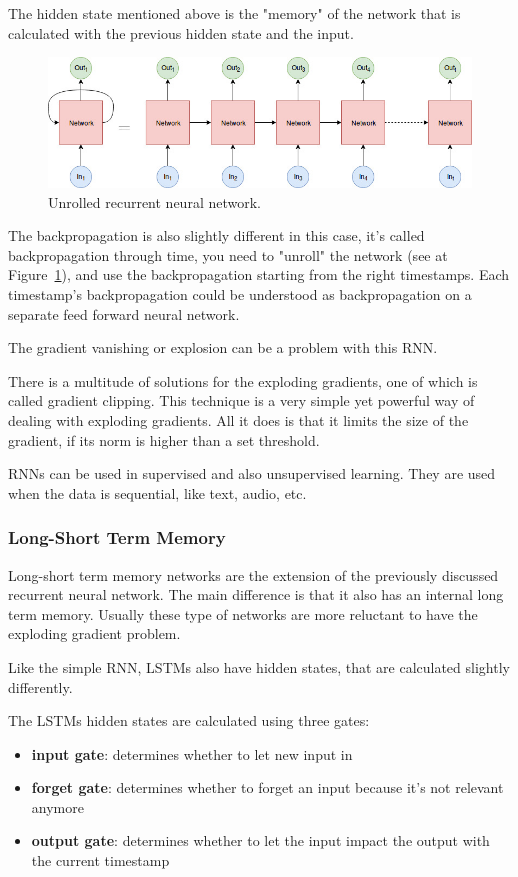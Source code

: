 The hidden state mentioned above is the "memory" of the network that is calculated with the previous hidden state and the input.

\begin{figure}[!ht]
	\centering
	\includegraphics[width=150mm, keepaspectratio]{figures/unrolled.jpg}
	\caption{Unrolled recurrent neural network.}
	\label{fig:unrolled}
\end{figure}

The backpropagation is also slightly different in this case, it's called backpropagation through time, you need to "unroll" the network (see at Figure~\ref{fig:unrolled}), and use the backpropagation starting from the right timestamps. Each timestamp's backpropagation could be understood as backpropagation on a separate feed forward neural network.

The gradient vanishing or explosion can be a problem with this RNN.

There is a multitude of solutions for the exploding gradients, one of which is called gradient clipping. This technique is a very simple yet powerful way of dealing with exploding gradients. All it does is that it limits the size of the gradient, if its norm is higher than a set threshold.

RNNs can be used in supervised and also unsupervised learning. They are used when the data is sequential, like text, audio, etc.

\subsubsection{Long-Short Term Memory}
Long-short term memory networks are the extension of the previously discussed recurrent neural network. The main difference is that it also has an internal long term memory. Usually these type of networks are more reluctant to have the exploding gradient problem.

Like the simple RNN, LSTMs also have hidden states, that are calculated slightly differently.
\\

\begin{minipage}{\textwidth}
	The LSTMs hidden states are calculated using three gates:
	\begin{itemize}
		\item \textbf{input gate}: determines whether to let new input in
		\item \textbf{forget gate}: determines whether to forget an input because it's not relevant anymore
		\item \textbf{output gate}: determines whether to let the input impact the output with the current timestamp
	\end{itemize}
\end{minipage}

